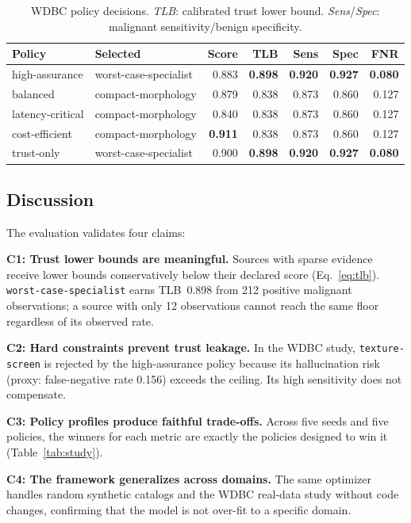 \documentclass[runningheads]{llncs}
\begin{document}
\begin{table}[t]
\caption{WDBC policy decisions.  \emph{TLB}: calibrated trust lower
  bound.  \emph{Sens}/\emph{Spec}: malignant sensitivity/benign specificity.}
\label{tab:wdbc_decisions}
\centering
\begin{tabular}{llrrrrr}
\toprule
Policy & Selected & Score & TLB & Sens & Spec & FNR\\
\midrule
high-assurance   & worst-case-specialist & 0.883 & \textbf{0.898} & \textbf{0.920} & \textbf{0.927} & \textbf{0.080}\\
balanced         & compact-morphology    & 0.879 & 0.838 & 0.873 & 0.860 & 0.127\\
latency-critical & compact-morphology    & 0.840 & 0.838 & 0.873 & 0.860 & 0.127\\
cost-efficient   & compact-morphology    & \textbf{0.911} & 0.838 & 0.873 & 0.860 & 0.127\\
trust-only       & worst-case-specialist & 0.900 & \textbf{0.898} & \textbf{0.920} & \textbf{0.927} & \textbf{0.080}\\
\bottomrule
\end{tabular}
\end{table}

\subsection{Discussion}

The evaluation validates four claims:

\smallskip\noindent\textbf{C1: Trust lower bounds are meaningful.}
Sources with sparse evidence receive lower bounds conservatively below
their declared score (Eq.~\ref{eq:tlb}).  \texttt{worst-case-specialist}
earns TLB~0.898 from 212 positive malignant observations; a source with
only 12 observations cannot reach the same floor regardless of its
observed rate.

\smallskip\noindent\textbf{C2: Hard constraints prevent trust leakage.}
In the WDBC study, \texttt{texture-screen} is rejected by the
high-assurance policy because its hallucination risk (proxy:
false-negative rate 0.156) exceeds the ceiling.  Its high sensitivity
does not compensate.

\smallskip\noindent\textbf{C3: Policy profiles produce faithful trade-offs.}
Across five seeds and five policies, the winners for each metric are
exactly the policies designed to win it (Table~\ref{tab:study}).

\smallskip\noindent\textbf{C4: The framework generalizes across domains.}
The same optimizer handles random synthetic catalogs and the WDBC
real-data study without code changes, confirming that the model is not
over-fit to a specific domain.
\end{document}

